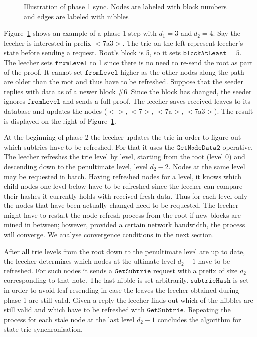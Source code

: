 \documentclass{amsart}
\begin{document}
\begin{figure}
\caption{Illustration of phase 1 sync. Nodes are labeled with block numbers and edges are labeled with nibbles.}
\label{fig:phase1_example}
\end{figure}

Figure~\ref{fig:phase1_example} shows an example of a phase 1 step with $d_1 = 3$ and $d_2 = 4$.
Say the leecher is interested in prefix $<$7a3$>$.
The trie on the left represent leecher's state before sending a request.
Root's block is 5, so it sets $\texttt{blockAtLeast}  = 5$.
The leecher sets $\texttt{fromLevel}$ to 1 since there is no need to re-send the root as part of the proof.
It cannot set $\texttt{fromLevel}$ higher as the other nodes along the path are older than the root and thus have to be refreshed.
Suppose that the seeder replies with data as of a newer block \#6.
Since the block has changed, the seeder ignores $\texttt{fromLevel}$ and sends a full proof.
The leecher saves received leaves to its database and updates the nodes  ($<>$, $<$7$>$, $<$7a$>$, $<$7a3$>$).
The result is displayed on the right of Figure~\ref{fig:phase1_example}.

At the beginning of phase 2 the leecher updates the trie in order to figure out which subtries have to be refreshed.
For that it uses the $\texttt{GetNodeData2}$ operative.
The leecher refreshes the trie level by level, starting from the root (level 0) and descending down to the penultimate level, level $d_2 - 2$.
Nodes at the same level may be requested in batch.
Having refreshed nodes for a level, it knows which child nodes one level below have to be refreshed since the leecher can compare their hashes it currently holds with received fresh data.
Thus for each level only the nodes that have been actually changed need to be requested.
The leecher might have to restart the node refresh process from the root if new blocks are mined in between;
however, provided a certain network bandwidth, the process will converge.
We analyse convergence conditions in the next section.

After all trie levels from the root down to the penultimate level are up to date, the leecher determines which nodes at the ultimate level $d_2 - 1$ have to be refreshed.
For such nodes it sends a $\texttt{GetSubtrie}$ request with a prefix of size $d_2$ corresponding to that note.
The last nibble is set arbitrarily.
$\texttt{subtrieHash}$ is set in order to avoid leaf resending in case the leaves the leecher obtained during phase 1 are still valid.
Given a reply the leecher finds out which of the nibbles are still valid and which have to be refreshed with $\texttt{GetSubtrie}$.
Repeating the process for each stale node at the last level $d_2-1$ concludes the algorithm for state trie synchronisation.
\end{document}
